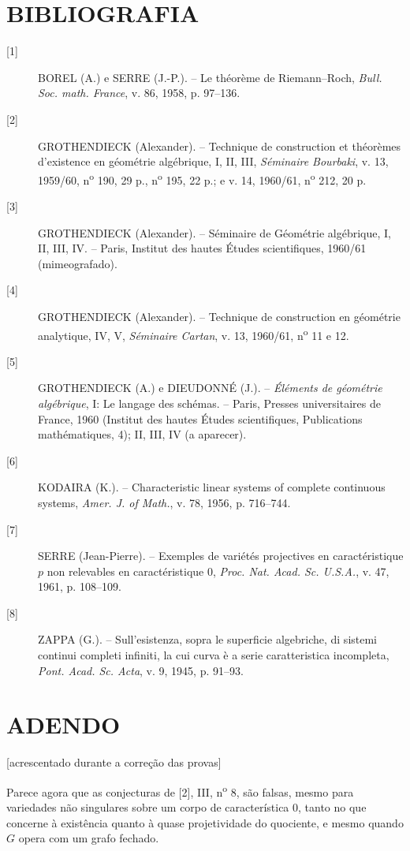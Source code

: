 \section*{BIBLIOGRAFIA}

\begin{description}
\item[{[1]}] BOREL (A.) e SERRE (J.-P.). -- Le théorème de Riemann--Roch,
\emph{Bull. Soc. math. France}, v. 86, 1958, p. 97--136.

\item[{[2]}] GROTHENDIECK (Alexander). -- Technique de construction et
théorèmes d'existence en géométrie algébrique, I, II, III, \emph{Séminaire
Bourbaki}, v. 13, 1959/60, n\textsuperscript{o} 190, 29 p.,
n\textsuperscript{o} 195, 22 p.; e v. 14, 1960/61,
n\textsuperscript{o} 212, 20 p.

\item[{[3]}] GROTHENDIECK (Alexander). -- Séminaire de Géométrie algébrique,
I, II, III, IV. -- Paris, Institut des hautes Études scientifiques, 1960/61
(mimeografado).

\item[{[4]}] GROTHENDIECK (Alexander). -- Technique de construction en
géométrie analytique, IV, V, \emph{Séminaire Cartan}, v. 13, 1960/61,
n\textsuperscript{o} 11 e 12.

\item[{[5]}] GROTHENDIECK (A.) e DIEUDONNÉ (J.). -- \emph{Éléments de
géométrie algébrique}, I: Le langage des schémas. -- Paris, Presses
universitaires de France, 1960 (Institut des hautes Études scientifiques,
Publications mathématiques, 4); II, III, IV (a aparecer).

\item[{[6]}] KODAIRA (K.). -- Characteristic linear systems of complete
continuous systems, \emph{Amer. J. of Math.}, v. 78, 1956, p. 716--744.

\item[{[7]}] SERRE (Jean-Pierre). -- Exemples de variétés projectives en
caractéristique $p$ non relevables en caractéristique 0, \emph{Proc. Nat. Acad.
Sc. U.S.A.}, v. 47, 1961, p. 108--109.

\item[{[8]}] ZAPPA (G.). -- Sull'esistenza, sopra le superficie algebriche, di
sistemi continui completi infiniti, la cui curva è a serie caratteristica
incompleta, \emph{Pont. Acad. Sc. Acta}, v. 9, 1945, p. 91--93.
\end{description}

\section*{ADENDO}
\begin{center}
{\small [acrescentado durante a correção das provas]}
\end{center}

Parece agora que as conjecturas de [2], III, n\textsuperscript{o} 8, são falsas,
mesmo para variedades não singulares sobre um corpo de característica 0, tanto
no que concerne à existência quanto à quase projetividade do quociente, e mesmo
quando $G$ opera com um grafo fechado.
